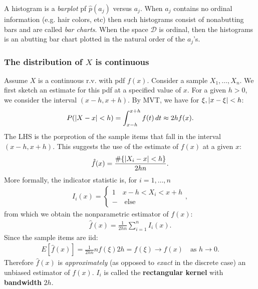 \documentclass{book}
\theoremstyle{definition}
\newcommand{\Else}{\text{else}}
\newcommand{\f}[2]{\frac{#1}{#2}}
\begin{document}
A histogram is a \textit{barplot} pf $\hat{p}(a_j)$ versus $a_j$. When $a_j$ contains no ordinal information (e.g. hair colors, etc) then such histograms consist of nonabutting bars and are called \textit{bar charts}. When the space $\mathcal{D}$ is ordinal, then the histograms is an abutting bar chart plotted in the natural order of the $a_j$'s. 


















\subsubsection{The distribution of $X$ is continuous}

Assume $X$ is a continuous r.v. with pdf $f(x)$. Consider a sample $X_1,\dots,X_n$. We first sketch an estimate for this pdf at a specified value of $x$. For a given $h > 0$, we consider the interval $(x-h,x+h)$. By MVT, we have for $\xi, \abs{x-\xi} < h$:
\begin{align}
P(\abs{X-x} < h) = \int^{x+h}_{x-h}f(t)\,dt \approx 2hf(x).
\end{align}
The LHS is the porprotion of the sample items that fall in the interval $(x-h,x+h)$. This suggests the use of the estimate of $f(x)$ at a given $x$:
\begin{align}
\hat{f}(x) = \f{\#\{ \abs{X_i - x} < h  \}}{2hn}.
\end{align} 
More formally, the indicator statistic is, for $i = 1,\dots, n$
\begin{align}
I_i(x) = \begin{cases}
1 \quad x-h < X_i < x+h\\
- \quad \Else
\end{cases},
\end{align}
from which we obtain the nonparametric estimator of $f(x)$:
\begin{align}
\hat{f}(x) = \f{1}{2hn}\sum^n_{i=1} I_i(x).
\end{align}
Since the sample items are iid:
\begin{align}
E[\hat{f}(x)] = \f{1}{2hn}nf(\xi)2h = f(\xi) \to f(x) \quad \text{as } h\to 0.
\end{align}
Therefore $\hat{f}(x)$ is \textit{approximately} (as opposed to \textit{exact} in the discrete case) an unbiased estimator of $f(x)$. $I_i$ is called the \textbf{rectangular kernel} with \textbf{bandwidth} $2h$.  \\
\end{document}
